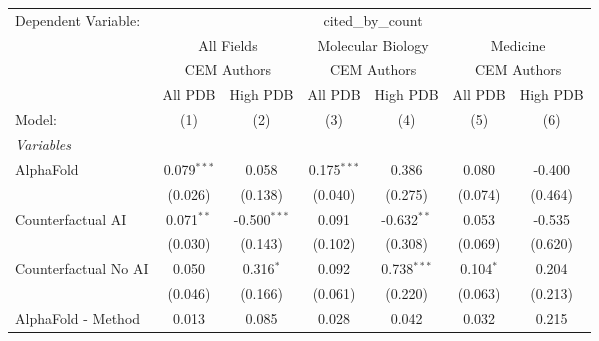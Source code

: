 \begingroup
\centering
\begin{tabular}{lcccccc}
   \tabularnewline \midrule \midrule
   Dependent Variable: & \multicolumn{6}{c}{cited\_by\_count}\\
 & \multicolumn{2}{c}{All Fields} & \multicolumn{2}{c}{Molecular Biology} & \multicolumn{2}{c}{Medicine} \\
\cmidrule(lr){2-3} \cmidrule(lr){4-5} \cmidrule(lr){6-7}
 & \multicolumn{2}{c}{CEM Authors} & \multicolumn{2}{c}{CEM Authors} & \multicolumn{2}{c}{CEM Authors} \\
\cmidrule(lr){2-3} \cmidrule(lr){4-5} \cmidrule(lr){6-7}
 & \multicolumn{1}{c}{All PDB} & \multicolumn{1}{c}{High PDB} & \multicolumn{1}{c}{All PDB} & \multicolumn{1}{c}{High PDB} & \multicolumn{1}{c}{All PDB} & \multicolumn{1}{c}{High PDB} \\
\cmidrule(lr){2-2} \cmidrule(lr){3-3} \cmidrule(lr){4-4} \cmidrule(lr){5-5} \cmidrule(lr){6-6} \cmidrule(lr){7-7}
   Model:                                                     & (1)            & (2)            & (3)           & (4)           & (5)           & (6)\\  
   \midrule
   \emph{Variables}\\
   AlphaFold                                                  & 0.079$^{***}$  & 0.058          & 0.175$^{***}$ & 0.386         & 0.080         & -0.400\\   
                                                              & (0.026)        & (0.138)        & (0.040)       & (0.275)       & (0.074)       & (0.464)\\   
   Counterfactual AI                                          & 0.071$^{**}$   & -0.500$^{***}$ & 0.091         & -0.632$^{**}$ & 0.053         & -0.535\\   
                                                              & (0.030)        & (0.143)        & (0.102)       & (0.308)       & (0.069)       & (0.620)\\   
   Counterfactual No AI                                       & 0.050          & 0.316$^{*}$    & 0.092         & 0.738$^{***}$ & 0.104$^{*}$   & 0.204\\   
                                                              & (0.046)        & (0.166)        & (0.061)       & (0.220)       & (0.063)       & (0.213)\\   
   AlphaFold - Method                                         & 0.013          & 0.085          & 0.028         & 0.042         & 0.032         & 0.215\\   

\end{tabular}
